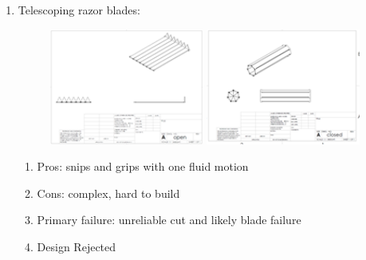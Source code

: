 \begin{enumerate}
\item Telescoping razor blades:
\begin{figure}
\begin{center}
\includegraphics[height=1.5in]{figures/robotarmmech1a.png}
\includegraphics[height=1.5in]{figures/robotarmmech1b.png}
\end{center}
\end{figure}
\begin{enumerate}
\item Pros: snips and grips with one fluid motion
\item Cons: complex, hard to build
\item Primary failure: unreliable cut and likely blade failure
\item Design Rejected
\end{enumerate}


\end{enumerate}
